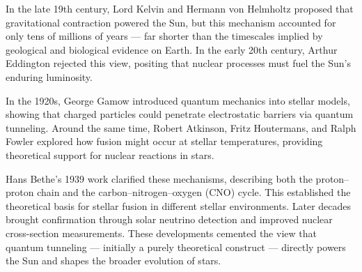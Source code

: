 \begin{historical}
In the late 19th century, Lord Kelvin and Hermann von Helmholtz proposed that gravitational contraction powered the Sun, but this mechanism accounted for only tens of millions of years — far shorter than the timescales implied by geological and biological evidence on Earth. In the early 20th century, Arthur Eddington rejected this view, positing that nuclear processes must fuel the Sun’s enduring luminosity.

In the 1920s, George Gamow introduced quantum mechanics into stellar models, showing that charged particles could penetrate electrostatic barriers via quantum tunneling. Around the same time, Robert Atkinson, Fritz Houtermans, and Ralph Fowler explored how fusion might occur at stellar temperatures, providing theoretical support for nuclear reactions in stars.

Hans Bethe’s 1939 work clarified these mechanisms, describing both the proton–proton chain and the carbon–nitrogen–oxygen (CNO) cycle. This established the theoretical basis for stellar fusion in different stellar environments. Later decades brought confirmation through solar neutrino detection and improved nuclear cross-section measurements. These developments cemented the view that quantum tunneling — initially a purely theoretical construct — directly powers the Sun and shapes the broader evolution of stars.
\end{historical}